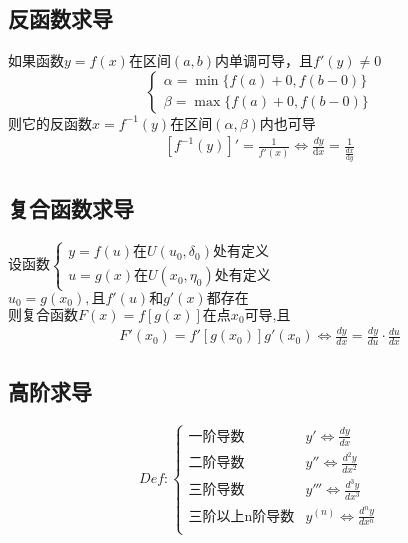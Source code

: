 \subsection{反函数求导}
如果函数$y=f(x)$在区间$(a,b)$内单调可导，且$f'(y)\neq 0$
$$\begin{cases}
  \alpha=\min\{f(a)+0,f(b-0)\}\\
  \beta=\max\{f(a)+0,f(b-0)\}
\end{cases}$$
则它的反函数$x=f^{-1}(y)$在区间$(\alpha,\beta)$内也可导
\begin{align}
  \left[f^{-1}(y)\right]'=\frac{1}{f'(x)}\Leftrightarrow \frac{dy}{\mathrm{d}{x}}=\frac{1}{\frac{dx}{\mathrm{d}{y}}} \label{derivative_of_inverse_function}
\end{align}
\subsection{复合函数求导}
\begin{center}
  设函数$\begin{cases}
    y=f(u)\mbox{在}U(u_0,\delta_0)\mbox{处有定义}\\
    u=g(x)\mbox{在}U(x_0,\eta_0)\mbox{处有定义}
  \end{cases}$\\
  $u_0=g(x_0),\mbox{且}f'(u)\mbox{和}g'(x)\mbox{都存在}$\\
  $\mbox{则复合函数}F(x)=f\left[g(x)\right]\mbox{在点}x_0\mbox{可导,且}$
  \begin{align}
    F'(x_0)=f'\left[g(x_0)\right]g'(x_0)\Leftrightarrow \frac{dy}{dx}=\frac{dy}{du}\cdot\frac{du}{dx}\label{derivative_of_composite_functions}
  \end{align}
\end{center}
\subsection{高阶求导}
$$Def:\begin{cases}
  \mbox{一阶导数} &y'\Leftrightarrow \frac{dy}{dx}\\
  \mbox{二阶导数}&y''\Leftrightarrow \frac{d^2y}{dx^2}\\
  \mbox{三阶导数}&y'''\Leftrightarrow \frac{d^3y}{dx^3}\\
  \mbox{三阶以上n阶导数}&y^{(n)}\Leftrightarrow \frac{d^ny}{dx^n}\\
\end{cases}$$
